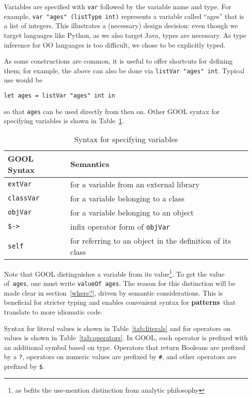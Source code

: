 \documentclass[sigplan,review,anonymous,prologue,dvipsnames]{acmart}
\newcommand{\abbrev}[1]{\textbf{#1}}
\newcommand{\oopatterns}{\abbrev{patterns}}
\begin{document}
Variables are specified with \verb|var| followed by the variable name and type. 
For example, \verb|var "ages" (listType int)| represents a variable called 
``ages'' that is a list of integers. This illustrates a (necessary) design
decision: even though we target languages like Python, as we also target
Java, types are necessary. As type inference for OO languages is too
difficult, we chose to be explicitly typed.

As some constructions are common, it is useful to offer shortcuts for
defining them; for example, the above can also be done via
\verb|listVar "ages" int|. Typical use would be
\begin{lstlisting}
let ages = listVar "ages" int in
\end{lstlisting}
so that \verb|ages| can be used directly from then on. Other GOOL syntax for 
specifying variables is shown in Table~\ref{tab:variables}.

\begin{table}[!h]
\caption{Syntax for specifying variables}
\begin{tabular}{p{} p{}}
  \textbf{GOOL Syntax} & \textbf{Semantics} \\
  \midrule
  \verb|extVar| & for a variable from an external library \\
  \verb|classVar| & for a variable belonging to a class \\
  \verb|objVar| & for a variable belonging to an object \\
  \verb|$->| & infix operator form of \verb|objVar| \\
  \verb|self| & for referring to an object in the definition of its class \\
\end{tabular}
\label{tab:variables}
\end{table}

Note that GOOL distinguishes a variable from its value\footnote{
as befits the use-mention distinction from analytic philosophy}. To get
the value of~\verb|ages|, one must write \verb|valueOf ages|. The reason for
this distinction will be made clear in section~\ref{where?}, driven
by semantic considerations. This is beneficial for stricter typing and
enables convenient syntax for \oopatterns~that translate to more idiomatic
code.

Syntax for literal values is shown in Table~\ref{tab:literals} and for 
operators on values is shown in Table~\ref{tab:operators}. In GOOL, each 
operator is prefixed with an additional symbol based on type. Operators that 
return Booleans are prefixed by a \verb|?|, operators on numeric values are 
prefixed by \verb|#|, and other operators are prefixed by \verb|$|.
\end{document}
